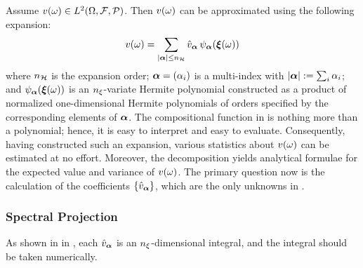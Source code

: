 Assume $v(\omega) \in L^{2}(\Omega, \mathcal{F}, \mathcal{P})$.
Then $v(\omega)$ can be approximated using the following expansion:
\begin{equation} \elab{wiener-chaos-decomposition}
  \w(\o) = \sum_{|\multiindex| \leq \ncorder} \coefficient{\w}_{\multiindex} \, \polynomial_{\multiindex}(\vz(\o))
\end{equation}
where ${n_\mathcal{H}}$ is the expansion order; $\boldsymbol \alpha = (\alpha_i)$ is a multi-index with $|\boldsymbol \alpha| := \sum_i \alpha_i$; and $\psi_{\boldsymbol \alpha}({\boldsymbol\xi}(\omega))$ is an ${n_\xi}$-variate Hermite polynomial constructed as a product of normalized one-dimensional Hermite polynomials of orders specified by the corresponding elements of $\boldsymbol \alpha$.
The compositional function in  is nothing more than a polynomial; hence, it is easy to interpret and easy to evaluate.
Consequently, having constructed such an expansion, various statistics about $v(\omega)$ can be estimated at no effort.
Moreover, the decomposition yields analytical formulae for the expected value and variance of $v(\omega)$.
The primary question now is the calculation of the coefficients $\{ \hat{v}_{\boldsymbol \alpha} \}$, which are the only unknowns in .

\subsubsection{Spectral Projection}
As shown in  in , each $\hat{v}_{\boldsymbol \alpha}$ is an ${n_\xi}$-dimensional integral, and the integral should be taken numerically.
